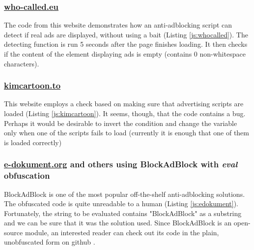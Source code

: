 
                       
\subsubsection{\url{who-called.eu}}
The code from this website demonstrates how an anti-adblocking script can detect if real
ads are displayed, without using a bait (Listing \ref{js:whocalled}).
The detecting function is run 5 seconds after the page finishes loading. It then checks if the content 
of the element displaying ads is empty (contains 0 non-whitespace characters).


                       
\subsubsection{\url{kimcartoon.to}}
This website employs a check based on making sure that advertising scripts
are loaded (Listing \ref{js:kimcartoon}). It seems, though, that the code contains a bug.
Perhaps it would be desirable to invert the condition and change the variable
only when one of the scripts fails to load (currently it is enough that one of them is loaded correctly)


                       
\subsubsection{\url{e-dokument.org} and others using BlockAdBlock with \emph{eval} obfuscation}
BlockAdBlock is one of the most popular off-the-shelf anti-adblocking solutions.
The obfuscated code is quite unreadable to a human (Listing \ref{js:edokument}).
Fortunately, the string to be evaluated contains "BlockAdBlock" as a substring and we can be sure that it was
the solution used. Since BlockAdBlock is an open-source module, an interested reader can check 
out its code in the plain, unobfuscated form on github \cite{github:blockadblock}.



